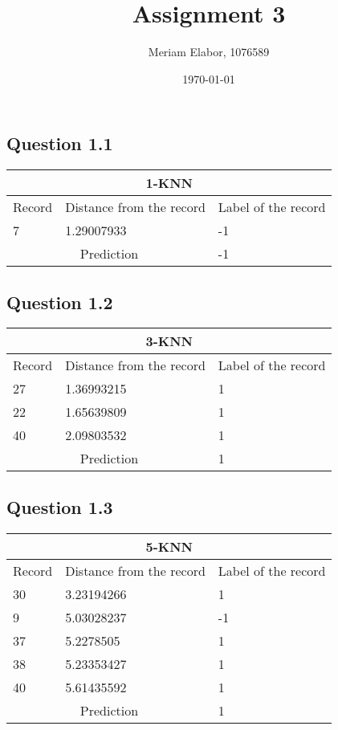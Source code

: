 \documentclass[10pt]{article}
\title{Assignment 3}
\author{Meriam Elabor, 1076589}
\date{\today}
\begin{document}
\maketitle
\subsection*{Question 1.1}
\begin{tabular}{ 
|p{4cm}||p{4cm}|p{4cm}|  }
 \hline
 \multicolumn{3}{|c|}{1-KNN} \\
 \hline
 Record & Distance from the record& Label of the record\\
 \hline
 7 & 1.29007933 & -1\\
 \hline
 \multicolumn{2}{|c|}{Prediction} & -1\\
 \hline
 
\end{tabular}

\bigskip
\subsection*{Question 1.2}
\begin{tabular}{ 
|p{4cm}||p{4cm}|p{4cm}|  }
 \hline
 \multicolumn{3}{|c|}{3-KNN} \\
 \hline
 
 Record & Distance from the record& Label of the record\\
 \hline
 27&1.36993215&1\\
 22&1.65639809&1\\
 40&2.09803532&1\\
 \hline
 \multicolumn{2}{|c|}{Prediction} & 1\\
 \hline
 
\end{tabular}

\bigskip

\subsection*{Question 1.3}
\begin{tabular}{ 
|p{4cm}||p{4cm}|p{4cm}|  }
 \hline
 \multicolumn{3}{|c|}{5-KNN} \\
 \hline
 
 Record & Distance from the record& Label of the record\\
 \hline
 30&3.23194266&1\\
 9&5.03028237&-1\\
 37&5.2278505&1\\
 38&5.23353427&1\\
 40&5.61435592&1\\
 \hline
 \multicolumn{2}{|c|}{Prediction} & 1\\
 \hline
 
\end{tabular}
\end{document}
